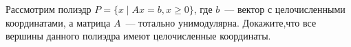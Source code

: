 Рассмотрим полиэдр $P = \{x \mid Ax = b, x \ge 0\}$, где $b$~--- вектор с целочисленными координатами, а
матрица $A$~--- тотально унимодулярна. Докажите,что все вершины данного полиэдра имеют целочисленные
координаты.